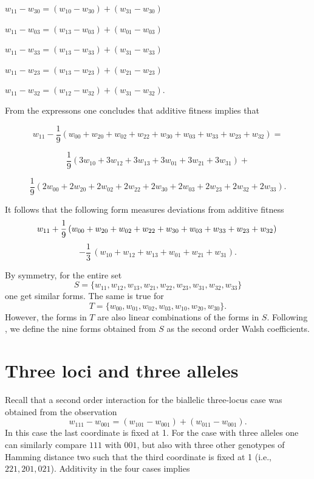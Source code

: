\documentclass[12pt]{amsart}
\theoremstyle{plain}
\theoremstyle{definition}
\begin{document}
$
w_{11}-w_{30}= (w_{10}-w_{30}) +(w_{31}-w_{30})
$




$
w_{11}-w_{03}= (w_{13}-w_{03}) +(w_{01}-w_{03})
$





$
w_{11}-w_{33}= (w_{13}-w_{33}) +(w_{31}-w_{33})
$




$
w_{11}-w_{23}= (w_{13}-w_{23}) +(w_{21}-w_{23})
$



$
w_{11}-w_{32}= (w_{12}-w_{32}) +(w_{31}-w_{32}).
$



\smallskip

From the expressons one concludes that additive fitness implies that


\[
w_{11}-\frac{1}{9} \left(w_{00} + w_{20} + w_{02}+  w_{22} + w_{30} + w_{03} + w_{33} + w_{23}+ w_{32} \right)=
\]

\[
\frac{1}{9} (3w_{10}+3w_{12}+3 w_{13}+3 w_{01}+3 w_{21}+3 w_{31}) +
\]

\[
\frac{1}{9} (2w_{00}+2w_{20}+2 w_{02}+ 2w_{22} +2w_{30}+2w_{03}+2 w_{23}+ 2 w_{32} + 2 w_{33}).
\]





\smallskip
It follows that the following form measures deviations from additive fitness
\[
w_{11}+\frac{1}{9} \left(w_{00} + w_{20} + w_{02}+  w_{22} + w_{30} + w_{03} + w_{33} + w_{23}+ w_{32} \right) \\
\]
\[
-\frac{1}{3} \, (w_{10}+w_{12}+w_{13}+w_{01}+w_{21}+w_{31}).
\]




By symmetry, for the entire set 
\[
S= \{ w_{11}, w_{12}, w_{13}, w_{21}, w_{22}, w_{23}, w_{31}, w_{32}, w_{33} \}
\]
one get similar forms.
The same is true for 
\[
T= \{ w_{00}, w_{01}, w_{02}, w_{03}, w_{10}, w_{20}, w_{30}  \}.
\]
However, the forms in $T$ are also linear combinations of the forms in $S$.
Following \citep{gs},
we define the nine forms obtained  from $S$ as the  second order Walsh coefficients.






\newpage



\section{Three loci and three alleles}
Recall that a second order interaction for the biallelic three-locus case
was obtained from the observation
\[
w_{111}-w_{001}=(w_{101}-w_{001})+(w_{011}-w_{001}).
\]
In this case the last coordinate is fixed at 1.
For the case with three alleles 
one can similarly compare $111$ with  $001$, but also with three  
other genotypes of  Hamming distance two such 
 that the third coordinate is fixed at 1 (i.e., $221, 201, 021$).
Additivity in the four cases implies
\end{document}

